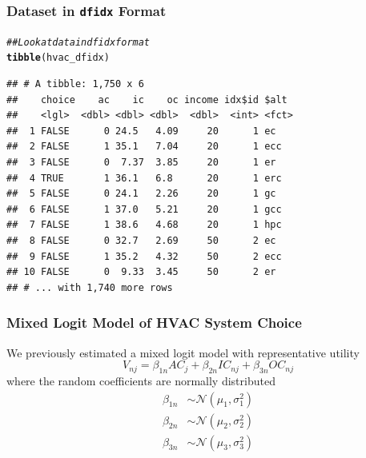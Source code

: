 \documentclass{beamer}\usepackage[]{graphicx}\usepackage[]{color}
\makeatletter
\newcommand{\hlcom}[1]{\textcolor[rgb]{0.678,0.584,0.686}{\textit{#1}}}%
\newcommand{\hlstd}[1]{\textcolor[rgb]{0.345,0.345,0.345}{#1}}%
\newcommand{\hlkwd}[1]{\textcolor[rgb]{0.737,0.353,0.396}{\textbf{#1}}}%
\newenvironment{kframe}{%
 \def\at@end@of@kframe{}%
 \ifinner\ifhmode%
  \def\at@end@of@kframe{\end{minipage}}%
  \begin{minipage}{\columnwidth}%
 \fi\fi%
 \def\FrameCommand##1{\hskip\@totalleftmargin \hskip-\fboxsep
 \colorbox{shadecolor}{##1}\hskip-\fboxsep
     \hskip-\linewidth \hskip-\@totalleftmargin \hskip\columnwidth}%
 \MakeFramed {\advance\hsize-\width
   \@totalleftmargin\z@ \linewidth\hsize
   \@setminipage}}%
 {\par\unskip\endMakeFramed%
 \at@end@of@kframe}
\newenvironment{knitrout}{}{} %
\makeatother
\begin{document}
\begin{frame}[fragile]\frametitle{Dataset in \texttt{dfidx} Format}
\begin{knitrout}\footnotesize
{}\color{fgcolor}\begin{kframe}
\begin{alltt}
\hlcom{## Look at data in dfidx format}
\hlkwd{tibble}\hlstd{(hvac_dfidx)}
\end{alltt}
\begin{verbatim}
## # A tibble: 1,750 x 6
##    choice    ac    ic    oc income idx$id $alt 
##    <lgl>  <dbl> <dbl> <dbl>  <dbl>  <int> <fct>
##  1 FALSE      0 24.5   4.09     20      1 ec   
##  2 FALSE      1 35.1   7.04     20      1 ecc  
##  3 FALSE      0  7.37  3.85     20      1 er   
##  4 TRUE       1 36.1   6.8      20      1 erc  
##  5 FALSE      0 24.1   2.26     20      1 gc   
##  6 FALSE      1 37.0   5.21     20      1 gcc  
##  7 FALSE      1 38.6   4.68     20      1 hpc  
##  8 FALSE      0 32.7   2.69     50      2 ec   
##  9 FALSE      1 35.2   4.32     50      2 ecc  
## 10 FALSE      0  9.33  3.45     50      2 er   
## # ... with 1,740 more rows
\end{verbatim}
\end{kframe}
\end{knitrout}
\end{frame}

\begin{frame}\frametitle{Mixed Logit Model of HVAC System Choice}
    We previously estimated a mixed logit model with representative utility
    $$V_{nj} = \beta_{1n} AC_j + \beta_{2n} IC_{nj} + \beta_{3n} OC_{nj}$$
    where the random coefficients are normally distributed
    \begin{align*}
        \beta_{1n} & \sim \mathcal{N}(\mu_1, \sigma_1^2) \\
        \beta_{2n} & \sim \mathcal{N}(\mu_2, \sigma_2^2) \\
        \beta_{3n} & \sim \mathcal{N}(\mu_3, \sigma_3^2)
    \end{align*}
\end{frame}
\end{document}
